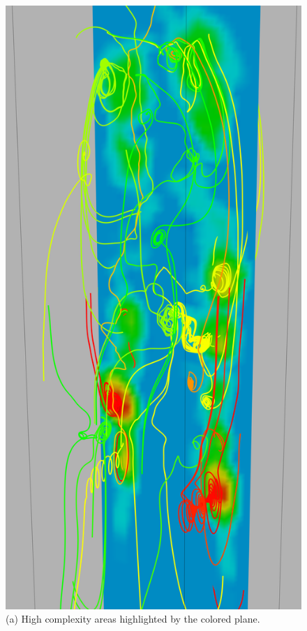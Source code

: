 \documentclass{egpubl}
\begin{document}
\begin{figure}[h]
        \centering
                \begin{minipage}{0.47\linewidth}
                        \includegraphics[height = 2\linewidth]{Images/plume_plane_crop.png}\\(a) High complexity areas highlighted by the colored plane. \vspace{0.2em}

\end{minipage}
\end{figure}
\end{document}
